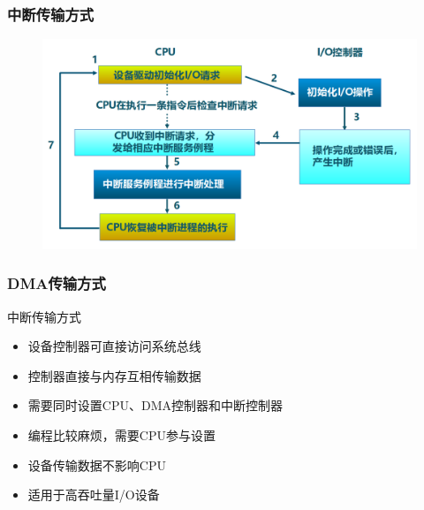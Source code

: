 \begin{frame}[fragile]
    \frametitle{中断传输方式}
        \begin{figure}
            \includegraphics[width=0.8\linewidth]{figs/interrupt-steps.png}
        \end{figure}
\end{frame}
\begin{frame}[fragile]
    \frametitle{DMA传输方式}
    中断传输方式
    \begin{itemize}
        \item 设备控制器可直接访问系统总线
        \item 控制器直接与内存互相传输数据
        \item 需要同时设置CPU、DMA控制器和中断控制器
        \item 编程比较麻烦，需要CPU参与设置
        \item 设备传输数据不影响CPU
        \item 适用于高吞吐量I/O设备
    \end{itemize}
\end{frame}
